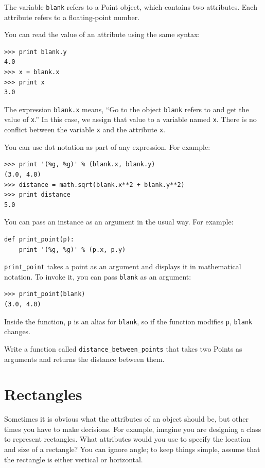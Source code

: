 \documentclass[10pt]{book}
\begin{document}
\begin{CJK}{UTF8}{gbsn}
The variable {\tt blank} refers to a Point object, which
contains two attributes.  Each attribute refers to a
floating-point number.

You can read the value of an attribute using the same syntax:

\begin{verbatim}
>>> print blank.y
4.0
>>> x = blank.x
>>> print x
3.0
\end{verbatim}
%
The expression {\tt blank.x} means, ``Go to the object {\tt blank}
refers to and get the value of {\tt x}.'' In this case, we assign that
value to a variable named {\tt x}.  There is no conflict between
the variable {\tt x} and the attribute {\tt x}.

You can use dot notation as part of any expression.  For example:

\begin{verbatim}
>>> print '(%g, %g)' % (blank.x, blank.y)
(3.0, 4.0)
>>> distance = math.sqrt(blank.x**2 + blank.y**2)
>>> print distance
5.0
\end{verbatim}
%
You can pass an instance as an argument in the usual way.
For example:

\begin{verbatim}
def print_point(p):
    print '(%g, %g)' % (p.x, p.y)
\end{verbatim}
%
\verb"print_point" takes a point as an argument and displays it in
mathematical notation.  To invoke it, you can pass {\tt blank} as
an argument:

\begin{verbatim}
>>> print_point(blank)
(3.0, 4.0)
\end{verbatim}
%
Inside the function, {\tt p} is an alias for {\tt blank}, so if
the function modifies {\tt p}, {\tt blank} changes.


\begin{exercise}

Write a function called \verb"distance_between_points" that takes two
Points as arguments and returns the distance between them.

\end{exercise}



\section{Rectangles}
\label{rectangles}

Sometimes it is obvious what the attributes of an object should be,
but other times you have to make decisions.  For example, imagine you
are designing a class to represent rectangles.  What attributes would
you use to specify the location and size of a rectangle?  You can
ignore angle; to keep things simple, assume that the rectangle is
either vertical or horizontal.


\end{CJK}
\end{document}
